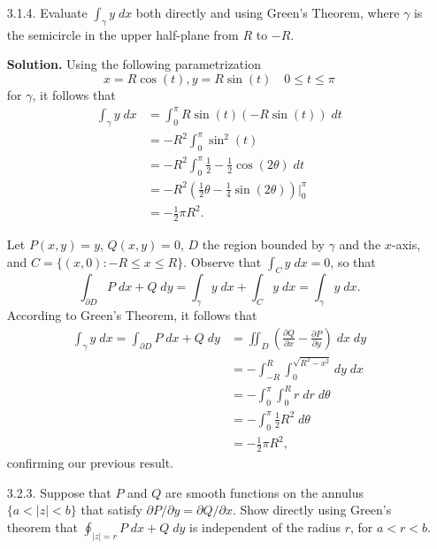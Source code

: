 \documentclass[9pt]{article}
\begin{document}
\begin{enumerate}
   \item[3.1.4.]  Evaluate $\int_\gamma y\;dx$ both directly and using
                  Green's Theorem, where $\gamma$ is the semicircle in the upper
                  half-plane from $R$ to $-R$.
                  
      \textbf{Solution.} Using the following parametrization
      $$x = R \cos(t), y = R \sin(t) \quad 0 \le t \le \pi$$
      for $\gamma$, it follows that
      \begin{align*}
         \int_\gamma y\;dx &= \int_0^\pi R \sin(t) (-R \sin(t))\;dt \\
            &= -R^2 \int_0^\pi \sin^2(t)\; \\
            &= -R^2 \int_0^\pi \frac{1}{2} - \frac{1}{2}\cos(2\theta)\;dt\\
            &= -R^2 \left(\frac{1}{2}\theta -
                  \frac{1}{4}\sin(2\theta)\right)\bigg|_0^\pi \\
            &= -\frac{1}{2}\pi R^2.
      \end{align*}
      
      Let $P(x, y) = y$, $Q(x, y) = 0$, $D$ the region bounded by $\gamma$ and
      the $x$-axis, and $C = \{(x, 0) : -R \le x \le R\}$. Observe that
      $\int_C y\;dx = 0$, so that
      $$\int_{\partial D} P\;dx + Q\;dy = \int_{\gamma} y\;dx + \int_C y\;dx =
      \int_{\gamma} y\;dx.$$
      According to Green's Theorem, it follows that
      \begin{align*}
         \int_{\gamma} y\;dx = \int_{\partial D} P\;dx + Q\;dy &= \iint_D
            \left(\frac{\partial Q}{\partial x} -
            \frac{\partial P}{\partial y}\right)\;dx\;dy \\
            &= -\int_{-R}^R\int_0^{\sqrt{R^2 - x^2}} dy\;dx \\
            &= -\int_0^\pi\int_0^R r\;dr\;d\theta \\
            &= -\int_0^\pi\frac{1}{2}R^2\;d\theta \\
            &= -\frac{1}{2}\pi R^2,
      \end{align*}
      confirming our previous result.
   \item[3.2.3.]  Suppose that $P$ and $Q$ are smooth functions on the annulus
                  $\{a < |z| < b\}$ that satisfy
                  $\partial P/ \partial y =  \partial Q/ \partial x$. Show
                  directly using Green's theorem that
                  $\oint_{|z|=r} P\;dx + Q\;dy$ is independent of the radius
                  $r$, for $a < r < b$.
                  

\end{enumerate}
\end{document}
